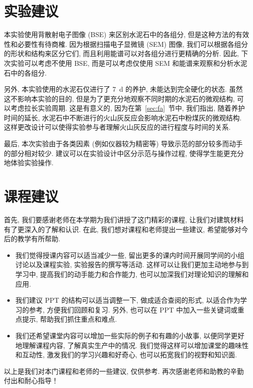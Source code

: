 
\section{实验建议}

本实验使用背散射电子图像 (BSE) 来区别水泥石中的各组分, 但是这种方法的有效性和必要性有待商榷.
因为根据扫描电子显微镜 (SEM) 图像, 我们可以根据各组分的形状和结构来区分它们, 而且利用能谱可以对各组分进行更精确的分析.
因此, 下次实验可以考虑不使用 BSE, 而是可以考虑仅使用 SEM 和能谱来观察和分析水泥石中的各组分.

另外, 本实验使用的水泥石仅进行了 \SI{7}{\day} 的养护, 未能达到完全硬化的状态.
虽然这不影响本实验的目的, 但是为了更充分地观察不同时期的水泥石的微观结构, 可以考虑拉长实验周期. 这是有意义的, 因为在第~\ref{sec:fa}~节中, 我们指出, 随着养护时间的延长, 水泥石中不断进行的火山灰反应会影响水泥石中粉煤灰的微观结构. 这样更改设计可以使得实验参与者理解火山灰反应的进行程度与时间的关系.

最后, 本次实验由于各类因素 (例如仪器较为精密等) 导致示范的部分较多而动手的部分相对较少.
建议可以在实验设计中区分示范与操作过程, 使得学生能更充分地体验实验操作.

\section{课程建议}


首先, 我们要感谢老师在本学期为我们讲授了这门精彩的课程, 让我们对建筑材料有了更深入的了解和认识.
在此, 我们想对课程和老师提出一些建议, 希望能够对今后的教学有所帮助.

\begin{itemize}
  \item 我们觉得授课内容可以适当减少一些, 留出更多的课内时间开展同学间的小组讨论以及课程实验, 实验报告的撰写等活动.
        这样可以让我们更加主动地参与到学习中, 提高我们的动手能力和合作能力, 也可以加深我们对理论知识的理解和应用.
  \item 我们建议 PPT 的结构可以适当调整一下, 做成适合查阅的形式, 以适合作为学习的参考, 方便我们回顾和复习.
        另外, 也可以在 PPT 中加入一些关键词或重点提示, 帮助我们抓住重点和难点.
  \item 我们还希望课堂内容可以增加一些实际的例子和有趣的小故事, 以便同学更好地理解课程内容, 了解真实生产中的情况.
        我们觉得这样可以增加课堂的趣味性和互动性, 激发我们的学习兴趣和好奇心, 也可以拓宽我们的视野和知识面.
\end{itemize}

以上是我们对本门课程和老师的一些建议, 仅供参考.
再次感谢老师和助教的辛勤付出和耐心指导！
